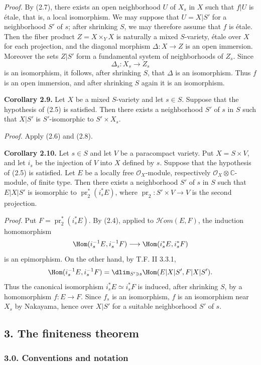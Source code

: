 \emph{Proof.} By (2.7), there exists an open neighborhood $U$ of $X_s$ in $X$ such that $f|U$ is étale, that is, a local isomorphism. We may suppose that $U=X|S'$ for a neighborhood $S'$ of $s$; after shrinking $S$, we may therefore assume that $f$ is étale. Then the fiber product $Z=X\times_YX$ is naturally a mixed $S$-variety, étale over $X$ for each projection, and the diagonal morphism $\Delta:X\to Z$ is an open immersion. Moreover the sets $Z|S'$ form a fundamental system of neighborhoods of $Z_s$. Since
\[
 \Delta_s:X_s\longrightarrow Z_s
\]
is an isomorphism, it follows, after shrinking $S$, that $\Delta$ is an isomorphism. Thus $f$ is an open immersion, and after shrinking $S$ again it is an isomorphism.

\textbf{Corollary 2.9.} Let $X$ be a mixed $S$-variety and let $s\in S$. Suppose that the hypothesis of (2.5) is satisfied. Then there exists a neighborhood $S'$ of $s$ in $S$ such that $X|S'$ is $S'$-isomorphic to $S'\times X_s$.

\emph{Proof.} Apply (2.6) and (2.8).

\textbf{Corollary 2.10.} Let $s\in S$ and let $V$ be a paracompact variety. Put $X=S\times V$, and let $i_s$ be the injection of $V$ into $X$ defined by $s$. Suppose that the hypothesis of (2.5) is satisfied. Let $E$ be a locally free $\mathcal O_X$-module, respectively $\mathcal O_X\otimes\mathbb C$-module, of finite type. Then there exists a neighborhood $S'$ of $s$ in $S$ such that $E|X|S'$ is isomorphic to $\operatorname{pr}_2^*(i_s^*E)$, where $\operatorname{pr}_2:S'\times V\to V$ is the second projection.

\emph{Proof.} Put $F=\operatorname{pr}_2^*(i_s^*E)$. By (2.4), applied to $\mathcal Hom(E,F)$, the induction homomorphism
\[
 \Hom(i_s^{-1}E,i_s^{-1}F)\longrightarrow \Hom(i_s^*E,i_s^*F)
\]
is an epimorphism. On the other hand, by T.F. II 3.3.1,
\[
 \Hom(i_s^{-1}E,i_s^{-1}F)
 =\dlim_{S'\ni s}\Hom(E|X|S',F|X|S') .
\]
Thus the canonical isomorphism $i_s^*E\simeq i_s^*F$ is induced, after shrinking $S$, by a homomorphism $f:E\to F$. Since $f_s$ is an isomorphism, $f$ is an isomorphism near $X_s$ by Nakayama, hence over $X|S'$ for a suitable neighborhood $S'$ of $s$.

\subsection*{3. The finiteness theorem}

\subsubsection*{3.0. Conventions and notation}

